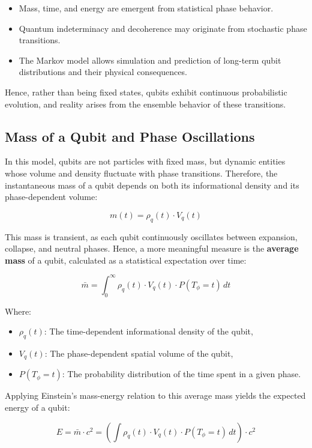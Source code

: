 \documentclass[12pt]{report} %
\begin{document}
\begin{itemize}
  \item Mass, time, and energy are emergent from statistical phase behavior.
  \item Quantum indeterminacy and decoherence may originate from stochastic phase transitions.
  \item The Markov model allows simulation and prediction of long-term qubit distributions and their physical consequences.
\end{itemize}

Hence, rather than being fixed states, qubits exhibit continuous probabilistic evolution, and reality arises from the ensemble behavior of these transitions.



\subsection{Mass of a Qubit and Phase Oscillations}

In this model, qubits are not particles with fixed mass, but dynamic entities whose volume and density fluctuate with phase transitions. Therefore, the instantaneous mass of a qubit depends on both its informational density and its phase-dependent volume:

\[
m(t) = \rho_q(t) \cdot V_q(t)
\]

This mass is transient, as each qubit continuously oscillates between expansion, collapse, and neutral phases. Hence, a more meaningful measure is the \textbf{average mass} of a qubit, calculated as a statistical expectation over time:

\[
\bar{m} = \int_{0}^{\infty} \rho_q(t) \cdot V_q(t) \cdot P(T_{\phi}=t) \, dt
\]

Where:
\begin{itemize}
  \item \( \rho_q(t) \): The time-dependent informational density of the qubit,
  \item \( V_q(t) \): The phase-dependent spatial volume of the qubit,
  \item \( P(T_{\phi}=t) \): The probability distribution of the time spent in a given phase.
\end{itemize}

Applying Einstein’s mass-energy relation to this average mass yields the expected energy of a qubit:

\[
E = \bar{m} \cdot c^2 = \left( \int \rho_q(t) \cdot V_q(t) \cdot P(T_{\phi}=t) \, dt \right) \cdot c^2
\]
\end{document}
